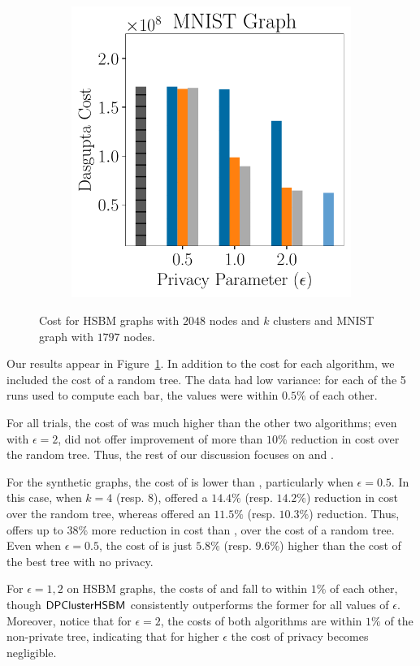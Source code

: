\begin{figure}
\begin{subfigure}[b]{\linewidth}
        \includegraphics[width=0.48\linewidth]{plots/mnist_cost.pdf}
    \end{subfigure}
    \caption[Cost for HSBM graphs and MNIST graph.]{Cost for HSBM graphs with $2048$ nodes and $k$ clusters and MNIST graph with $1797$ nodes.}
    \label{chap5-fig:exp-results}
    
\end{figure}

Our results appear in Figure~\ref{chap5-fig:exp-results}. In addition to the cost for each algorithm, we included the cost of a random tree. The data had low variance: for each of the 5 runs used to compute each bar, the values were within $0.5\%$ of each other.

For all trials, 
the cost of \linkage{} was much higher than the other two algorithms; even with $\epsilon = 2$, \linkage{} did not offer improvement of more than $10\%$ reduction in cost over the random tree. Thus, the rest of our discussion focuses on \dphchsbm{} and \sparsecut{}.

For the synthetic graphs,
the cost of \dphchsbm{} is lower than \sparsecut{}, particularly when $\epsilon = 0.5$. In this case, when $k=4$ (resp. $8$), \dphchsbm{} offered a $14.4\%$ (resp. $14.2\%$) reduction in cost over the random tree, whereas \sparsecut{} offered an $11.5\%$ (resp. $10.3\%$) reduction.
Thus, \dphchsbm{} offers up to $38\%$ more reduction in cost than \sparsecut{}, over the cost of a random tree. Even when $\epsilon = 0.5$, the cost of \dphchsbm{} is just $5.8\%$ (resp. $9.6\%$) higher than the cost of the best tree with no privacy.

For $\epsilon = 1,2$ on HSBM graphs, the costs of \sparsecut{} and \dphchsbm{} fall to within $1\%$ of each other, though $\textsf{DPClusterHSBM}{}$ consistently outperforms the former for all values of $\epsilon$. Moreover, notice that for $\epsilon = 2$, the costs of both algorithms are within $1\%$ of the non-private tree, indicating that for higher $\epsilon$ the cost of privacy becomes negligible.

